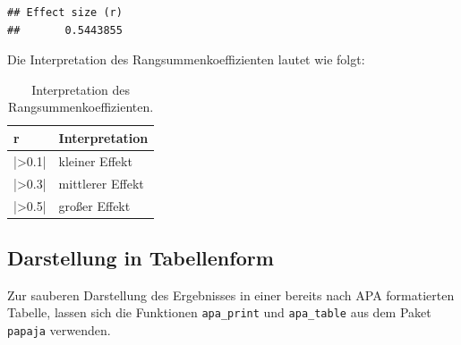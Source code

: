 \documentclass[
]{book}
\newenvironment{Shaded}{\begin{snugshade}}{\end{snugshade}}
\newcommand{\AttributeTok}[1]{\textcolor[rgb]{0.13,0.29,0.53}{#1}}
\newcommand{\FunctionTok}[1]{\textcolor[rgb]{0.13,0.29,0.53}{\textbf{#1}}}
\newcommand{\NormalTok}[1]{#1}
\newcommand{\OtherTok}[1]{\textcolor[rgb]{0.56,0.35,0.01}{#1}}
\newcommand{\SpecialCharTok}[1]{\textcolor[rgb]{0.81,0.36,0.00}{\textbf{#1}}}
\newcommand{\StringTok}[1]{\textcolor[rgb]{0.31,0.60,0.02}{#1}}
\begin{document}
\begin{verbatim}
## Effect size (r) 
##       0.5443855
\end{verbatim}

Die Interpretation des Rangsummenkoeffizienten lautet wie folgt:

\begin{table}[tbp]

\begin{center}
\begin{threeparttable}

\caption{\label{tab:unnamed-chunk-271}Interpretation des Rangsummenkoeffizienten.}

\begin{tabular}{ll}
\toprule
r & \multicolumn{1}{c}{Interpretation}\\
\midrule
|>0.1| & kleiner Effekt\\
|>0.3| & mittlerer Effekt\\
|>0.5| & großer Effekt\\
\bottomrule
\end{tabular}

\end{threeparttable}
\end{center}

\end{table}

\subsection{Darstellung in Tabellenform}\label{darstellung-in-tabellenform-3}

Zur sauberen Darstellung des Ergebnisses in einer bereits nach APA formatierten Tabelle, lassen sich die Funktionen \texttt{apa\_print} und \texttt{apa\_table} aus dem Paket \texttt{papaja} verwenden.

\begin{Shaded}
\end{Shaded}
\end{document}
